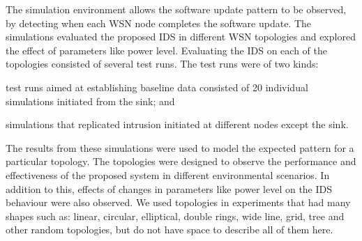 \documentclass[conference,final]{IEEEtran}
\begin{document}
The simulation environment allows the software update pattern to be observed, by detecting when each WSN node completes the software update.
The simulations evaluated the proposed IDS in different WSN topologies and explored the effect of parameters like power level.
Evaluating the IDS on each of the topologies consisted of several test runs.
The test runs were of two kinds: 
\begin{inparaenum}
\item test runs aimed at establishing baseline data consisted of 20 individual simulations initiated from the sink; and
\item simulations that replicated intrusion initiated at different nodes except the sink.
\end{inparaenum}
The results from these simulations were used to model the expected pattern for a particular topology.
%
The topologies were designed to observe the performance and effectiveness %
of the proposed system in different environmental scenarios. 
In addition to this, effects of changes in parameters like power level on the IDS behaviour were also observed.
We used topologies in experiments that had many shapes such as: linear, circular, elliptical, double rings, wide line, grid, tree and other random topologies, but do not have space to describe all of them here.
\end{document}
